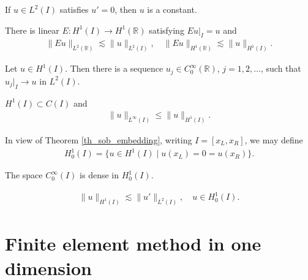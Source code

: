 \documentclass[12pt,oneside]{amsart}
\def\R{\mathbb R}
\begin{document}
\begin{lemma}
If $u \in L^2(I)$ satisfies $u' = 0$, then $u$ is a constant. 
\end{lemma}

\begin{theorem}
There is linear $E : H^1(I) \to H^1(\R)$
satisfying $E u|_{I} = u$ and
    \begin{align*}
\|E u\|_{L^2(\R)} \lesssim \|u\|_{L^2(I)},
\quad 
\|E u\|_{H^1(\R)} \lesssim \|u\|_{H^1(I)}.
    \end{align*}
\end{theorem}

\begin{theorem}
Let $u \in H^1(I)$. Then there is a sequence $u_j \in C_0^\infty(\R)$, $j=1,2,\dots$, such that $u_j|_{I} \to u$ in $L^2(I)$.
\end{theorem}

\begin{theorem}\label{th_sob_embedding}
$H^1(I) \subset C(I)$ and 
    \begin{align*}
\|u\|_{L^\infty(I)} \le \|u\|_{H^1(I)}.
    \end{align*}
\end{theorem}

In view of Theorem \ref{th_sob_embedding}, writing $I=[x_L, x_R]$, we may define
    \begin{align*}
H_0^1(I) = \{u \in H^1(I) \mid u(x_L) = 0 = u(x_R) \}.
    \end{align*}

\begin{theorem}\label{th_density_H01}
The space $C_0^\infty(I)$ is dense in $H^1_0(I)$.
\end{theorem}

\begin{proposition}\label{prop_poincare}
    \begin{align*}
\|u\|_{H^1(I)} \lesssim \|u'\|_{L^2(I)}, \quad u \in H_0^1(I).
    \end{align*}
\end{proposition}

\section{Finite element method in one dimension}
\end{document}

